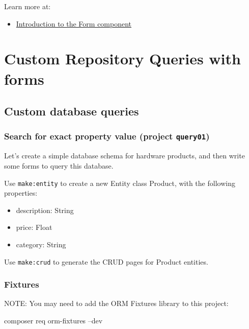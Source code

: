 \documentclass[a4paperpaper,openright]{book}
\newenvironment{Shaded}{}{}
\newcommand{\ExtensionTok}[1]{#1}
\newcommand{\NormalTok}[1]{#1}
\providecommand{\tightlist}{%
  \setlength{\itemsep}{0pt}\setlength{\parskip}{0pt}}
\begin{document}
Learn more at:

\begin{itemize}
\tightlist
\item
  \href{https://symfony.com/doc/current/components/form.html}{Introduction
  to the Form component}
\end{itemize}

\part{Custom Repository Queries with forms}

\hypertarget{custom-database-queries}{%
\chapter{Custom database queries}\label{custom-database-queries}}

\hypertarget{search-for-exact-property-value-project-query01}{%
\section{\texorpdfstring{Search for exact property value (project
\texttt{query01})}{Search for exact property value (project query01)}}\label{search-for-exact-property-value-project-query01}}

Let's create a simple database schema for hardware products, and then
write some forms to query this database.

Use \texttt{make:entity} to create a new Entity class Product, with the
following properties:

\begin{itemize}
\tightlist
\item
  description: String
\item
  price: Float
\item
  category: String
\end{itemize}

Use \texttt{make:crud} to generate the CRUD pages for Product entities.

\hypertarget{fixtures}{%
\section{Fixtures}\label{fixtures}}

NOTE: You may need to add the ORM Fixtures library to this project:

\begin{Shaded}
\begin{Highlighting}[]
\ExtensionTok{composer}\NormalTok{ req orm-fixtures --dev}
\end{Highlighting}
\end{Shaded}
\end{document}
